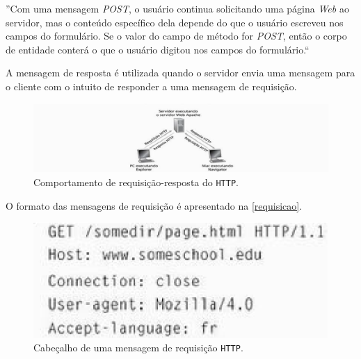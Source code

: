 \begin{citacao}
''Com uma mensagem \textit{POST}, o usuário continua solicitando uma página \textit{Web} ao
servidor, mas o conteúdo específico dela depende do que o usuário escreveu nos
campos do formulário. Se o valor do campo de método for \textit{POST}, então o corpo de
entidade conterá o que o usuário digitou nos campos do formulário.``
\end{citacao}

A mensagem de resposta é utilizada quando o servidor envia uma mensagem para o
cliente com o intuito de responder a uma mensagem de requisição.

\begin{figure}[h]
	\centering
	\caption{\label{req-resp}Comportamento de requisição-resposta do \texttt{HTTP}.}
		\includegraphics[keepaspectratio=true,scale=1]{figuras/req-resp.eps}
\end{figure}


O formato das mensagens de requisição é apresentado na \autoref{requisicao}.

\begin{figure}[h]
	\centering
	\caption{\label{requisicao}Cabeçalho de uma mensagem de requisição \texttt{HTTP}.}
		\includegraphics[keepaspectratio=true,scale=1]{figuras/requisicao.eps}
\end{figure}

